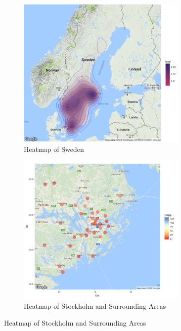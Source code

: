 \documentclass[10pt,a4paper, hidelinks]{article} %
\begin{document}
\begin{figure}[H]
\centering
\begin{subfigure}{.5\textwidth}
	\centering
	\includegraphics[width=0.9\textwidth]{../fig/HeatmapPoly.png}
	\caption{Heatmap of Sweden}
	\label{fig:sub1}
\end{subfigure}%
\begin{subfigure}{.5\textwidth}
\centering
	\includegraphics[width=0.9\textwidth]{../fig/HeatmapStockholm.png}
	\caption{Heatmap of Stockholm and Surrounding Areas}
	\label{fig:sub2}
\end{subfigure}
\label{fig:test}
\end{figure}
\end{document}
